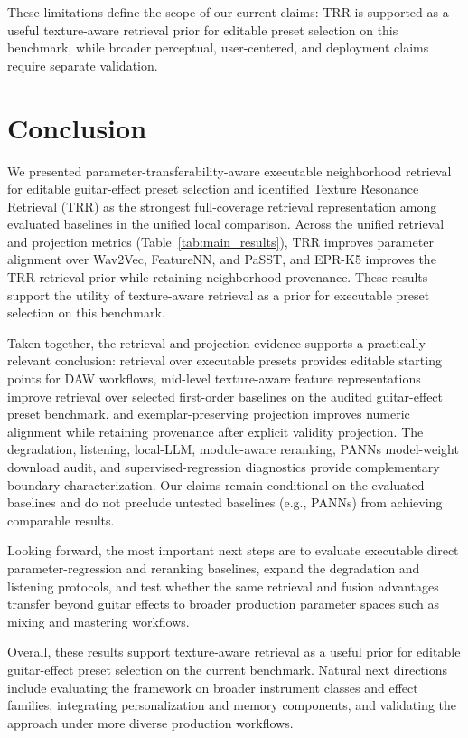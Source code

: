 These limitations define the scope of our current claims: TRR is supported as a useful texture-aware retrieval prior for editable preset selection on this benchmark, while broader perceptual, user-centered, and deployment claims require separate validation.

\section{Conclusion}
\label{sec:conclusion}

We presented parameter-transferability-aware executable neighborhood retrieval for editable guitar-effect preset selection and identified Texture Resonance Retrieval (TRR) as the strongest full-coverage retrieval representation among evaluated baselines in the unified local comparison. Across the unified retrieval and projection metrics (Table~\ref{tab:main_results}), TRR improves parameter alignment over Wav2Vec, FeatureNN, and PaSST, and EPR-K5 improves the TRR retrieval prior while retaining neighborhood provenance. These results support the utility of texture-aware retrieval as a prior for executable preset selection on this benchmark.

Taken together, the retrieval and projection evidence supports a practically relevant conclusion: retrieval over executable presets provides editable starting points for DAW workflows, mid-level texture-aware feature representations improve retrieval over selected first-order baselines on the audited guitar-effect preset benchmark, and exemplar-preserving projection improves numeric alignment while retaining provenance after explicit validity projection. The degradation, listening, local-LLM, module-aware reranking, PANNs model-weight download audit, and supervised-regression diagnostics provide complementary boundary characterization. Our claims remain conditional on the evaluated baselines and do not preclude untested baselines (e.g., PANNs) from achieving comparable results.

Looking forward, the most important next steps are to evaluate executable direct parameter-regression and reranking baselines, expand the degradation and listening protocols, and test whether the same retrieval and fusion advantages transfer beyond guitar effects to broader production parameter spaces such as mixing and mastering workflows.

Overall, these results support texture-aware retrieval as a useful prior for editable guitar-effect preset selection on the current benchmark. Natural next directions include evaluating the framework on broader instrument classes and effect families, integrating personalization and memory components, and validating the approach under more diverse production workflows.


\begingroup
\sloppy
\raggedright
{}

\endgroup
